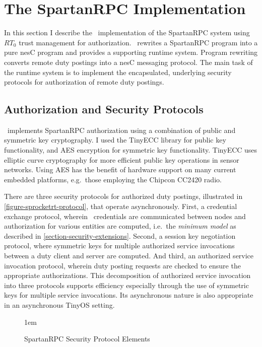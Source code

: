 \section{The SpartanRPC Implementation}
\label{section-implementation}

In this section I describe the \Sprocket\ implementation of the SpartanRPC system using $RT_0$
trust management for authorization. \Sprocket\ rewrites a SpartanRPC program into a pure nesC
program and provides a supporting runtime system. Program rewriting converts remote duty
postings into a nesC messaging protocol. The main task of the runtime system is to implement the
encapsulated, underlying security protocols for authorization of remote duty postings.

\subsection{Authorization and Security Protocols}
\label{section-security-protocols}
\label{section-underlying-protocols}

\Sprocket\ implements SpartanRPC authorization using a combination of public and symmetric key
cryptography. I used the TinyECC library \cite{Liu-Peng-TinyECC-2008} for public key
functionality, and AES encryption for symmetric key functionality. TinyECC uses elliptic curve
cryptography for more efficient public key operations in sensor networks. Using AES has the
benefit of hardware support on many current embedded platforms, e.g.~those employing the Chipcon
CC2420 radio.

There are three security protocols for authorized duty postings, illustrated in
\autoref{figure-sprocketrt-protocol}, that operate asynchronously. First, a credential exchange
protocol, wherein \RT\ credentials are communicated between nodes and authorization for various
entities are computed, i.e.~the \emph{minimum model} as described in
\autoref{section-security-extensions}. Second, a session key negotiation protocol, where
symmetric keys for multiple authorized service invocations between a duty client and server are
computed. And third, an authorized service invocation protocol, wherein duty posting requests
are checked to ensure the appropriate authorizations. This decomposition of authorized service
invocation into three protocols supports efficiency especially through the use of symmetric keys
for multiple service invocations. Its asynchronous nature is also appropriate in an asynchronous
TinyOS setting.

\begin{figure}[t]
  
  \centerline{\raise 1em\box\graph}
  \vspace{2mm}
  \caption{SpartanRPC Security Protocol Elements}
  \label{figure-sprocketrt-protocol}
\end{figure}

